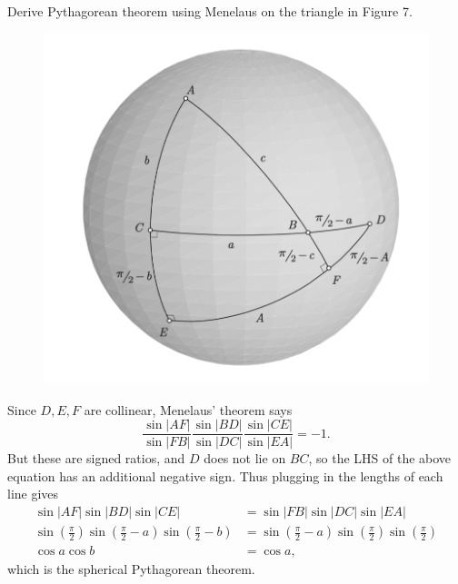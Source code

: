 \documentclass[twoside,10pt]{article}
\begin{document}
\newpage

\begin{exer}[10.21]
Derive Pythagorean theorem using Menelaus on the triangle in Figure 7.
\end{exer}

\begin{figure}[H]
	\centering
	\includegraphics[scale=0.7]{fig/21.pdf}
\end{figure}

Since $D,E,F$ are collinear, Menelaus' theorem says
\[
\frac{\sin |AF|}{\sin |FB|} \frac{\sin |BD|}{\sin |DC|} \frac{\sin |CE|}{\sin |EA|} = -1.
\] But these are signed ratios, and $D$ does not lie on $BC$, so the LHS of the above equation has an additional negative sign. Thus plugging in the lengths of each line gives
\begin{align*}
	\sin|AF|\sin|BD|\sin|CE| &= \sin|FB|\sin|DC|\sin|EA| \\
	\sin\left( \frac{\pi}{2} \right) \sin\left( \frac{\pi}{2} -a \right)\sin\left( \frac{\pi}{2} -b \right) &= \sin\left( \frac{\pi}{2} -a \right)\sin\left( \frac{\pi}{2} \right)\sin\left( \frac{\pi}{2}  \right) \\
	\cos a \cos b &= \cos a,
\end{align*}
which is the spherical Pythagorean theorem.

\newpage
\end{document}
